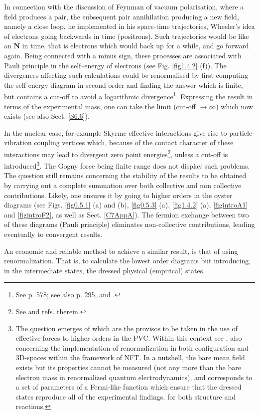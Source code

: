 \begin{subappendices}
 In connection with the discussion of Feynman of vacuum polarisation, where a field produces a pair,
 the subsequent pair annihilation producing a new field, namely a close loop, he implemented in his space-time trajectories, 
 Wheeler's idea of electrons going backwards in time (positrons).  Such trajectories would be like an $\mathbf N$ in time,
 that is electrons which would back up for a while, and go forward again. Being connected 
 with a minus sign, these processes are associated with Pauli principle in the self--energy of electrons
 (see Fig. \ref{fig1.4.2} (f)). 
 The divergences affecting
 such calculations  could be renormalised by first computing the self-energy  diagram in second order and finding the answer which is finite, but contains a cut-off
 to avoid a logarithmic divergence\footnote{See \cite{Bethe:47,Feynman:61b,Weinberg:96} p. 578; see also \cite{Mehra:96} p. 295, and \cite{Bjorken:98}.}. Expressing the result in terms of the experimental mass, one can take 
 the limit (cut-off $\to \infty$) which now exists (see also Sect. \ref{S6.6}).
  
 In the nuclear case, for example Skyrme effective interactions give 
 rise to particle-vibration coupling vertices which, because of the contact character of these interactions 
 may lead to divergent zero point energies\footnote{See \cite{Hellemans:13,Pastore:15} and refs. therein.}, unless a cut-off is introduced\footnote{The question emerges of which are the provisos to be taken in the use of effective forces to higher orders in the PVC. Within this context see \cite{Mahaux:85}, also \cite{Broglia:16,Barranco:17} concerning the implementation of renormalization in both configuration and 3D-spaces within the framework of NFT. In a nutshell, the bare mean field exists but its properties cannot be measured (not any more than the bare electron mass in renormalized quantum electrodynamics), and corresponds to a set of parameters of a Fermi-like function which ensure that the dressed states reproduce all of the experimental findings, for both structure and reactions.}.
 The Gogny force being finite range does not display such problems. The question still remains concerning the stability of the results to be obtained by carrying out a complete summation over both collective and non collective contributions. 
 Likely, one ensures it   by going to higher orders in the oyster diagrams (see Figs. \ref{fig0.5.1} (a) and (b), \ref{fig0.5.3} (a),  \ref{fig1.4.2} (a), \ref{figintroA1} and \ref{figintroF2}, as well as Sect. \ref{C7AppA}). 
 The fermion exchange between two of these diagrams (Pauli principle)  eliminates  non-collective
 contributions, leading eventually to convergent results.
 
 An economic and reliable method to achieve a similar result, 
 is that of using renormalization. That is, to calculate the lowest order diagrams 
 but introducing, in the intermediate states, the dressed physical (empirical) states.
 
 


\end{subappendices}


